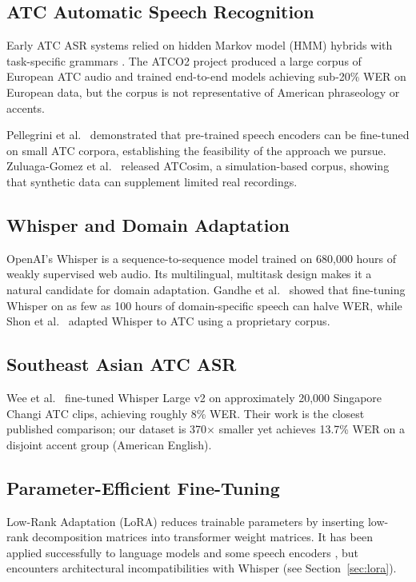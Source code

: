 \documentclass[11pt,a4paper]{article}
\begin{document}
\subsection{ATC Automatic Speech Recognition}

Early ATC ASR systems relied on hidden Markov model (HMM) hybrids with
task-specific grammars \cite{cordero2012atcasr}.
The ATCO2 project \cite{kocour2021atco2} produced a large corpus of European
ATC audio and trained end-to-end models achieving sub-20\% WER on European
data, but the corpus is not representative of American phraseology or accents.

Pellegrini et al.\ \cite{pellegrini2021atc} demonstrated that pre-trained
speech encoders can be fine-tuned on small ATC corpora, establishing the
feasibility of the approach we pursue.
Zuluaga-Gomez et al.\ \cite{zuluagagomez2022atcosim} released ATCosim, a
simulation-based corpus, showing that synthetic data can supplement limited
real recordings.

\subsection{Whisper and Domain Adaptation}

OpenAI's Whisper \cite{radford2023whisper} is a sequence-to-sequence model
trained on 680,000 hours of weakly supervised web audio.
Its multilingual, multitask design makes it a natural candidate for domain
adaptation.
Gandhe et al.\ \cite{gandhe2023whisperadapt} showed that fine-tuning Whisper
on as few as 100 hours of domain-specific speech can halve WER, while
Shon et al.\ \cite{shon2023whisperatc} adapted Whisper to ATC using a
proprietary corpus.

\subsection{Southeast Asian ATC ASR}

Wee et al.\ \cite{wee2023singaporeatc} fine-tuned Whisper Large v2 on
approximately 20,000 Singapore Changi ATC clips, achieving roughly 8\% WER.
Their work is the closest published comparison; our dataset is 370$\times$
smaller yet achieves 13.7\% WER on a disjoint accent group (American English).

\subsection{Parameter-Efficient Fine-Tuning}

Low-Rank Adaptation (LoRA) \cite{hu2021lora} reduces trainable parameters
by inserting low-rank decomposition matrices into transformer weight matrices.
It has been applied successfully to language models \cite{dettmers2023qlora}
and some speech encoders \cite{kim2023loraspeech}, but encounters
architectural incompatibilities with Whisper (see Section~\ref{sec:lora}).
\end{document}
